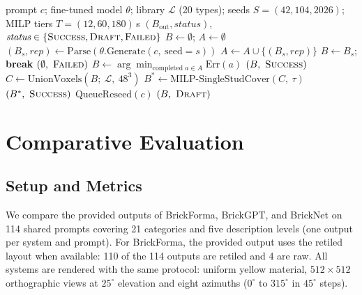 \documentclass[letterpaper]{article} %
\begin{document}
\begin{algorithm}[t]
\caption{BrickForma inference and retiling}
\label{alg:inference-retiling}
\small
\begin{algorithmic}[1]
\REQUIRE prompt $c$; fine-tuned model $\theta$; library $\mathcal{L}$ (20 types); seeds $S=(42,104,2026)$; MILP tiers $T=(12,60,180)$\,s
\ENSURE $(B_{\mathrm{out}}, \textit{status})$, $\textit{status}\in\{\textsc{Success},\textsc{Draft},\textsc{Failed}\}$
\STATE $B \gets \emptyset$; $A \gets \emptyset$
  \STATE $(B_s,\textit{rep}) \gets \mathrm{Parse}(\theta.\mathrm{Generate}(c,\ \mathrm{seed}{=}s))$
  \STATE $A \gets A \cup \{(B_s,\textit{rep})\}$
    \STATE $B \gets B_s$; \textbf{break}
  \ENDIF
\ENDFOR
{}
    \RETURN $(\emptyset,\ \textsc{Failed})$
  \ENDIF
  \STATE $B \gets \arg\min_{\text{completed } a\in A} \mathrm{Err}(a)$
\ENDIF
{}
  \RETURN $(B,\ \textsc{Success})$ 
\ENDIF
\STATE $C \gets \mathrm{UnionVoxels}(B;\ \mathcal{L},\ 48^3)$ 
  \STATE $B^{*} \gets \mathrm{MILP\text{-}SingleStudCover}(C,\ \tau)$
    \RETURN $(B^{*},\ \textsc{Success})$
  \ENDIF
\ENDFOR
\STATE $\mathrm{QueueReseed}(c)$
\RETURN $(B,\ \textsc{Draft})$ 
\end{algorithmic}
\end{algorithm}

\section{Comparative Evaluation}
\label{sec:eval}
\subsection{Setup and Metrics}
\label{sec:setup}
We compare the provided outputs of BrickForma, BrickGPT, and BrickNet on 114 shared prompts covering 21 categories and five description levels (one output per system and prompt). For BrickForma, the provided output uses the retiled layout when available: 110 of the 114 outputs are retiled and 4 are raw. All systems are rendered with the same protocol: uniform yellow material, $512{\times}512$ orthographic views at $25^{\circ}$ elevation and eight azimuths ($0^{\circ}$ to $315^{\circ}$ in $45^{\circ}$ steps).
\end{document}
